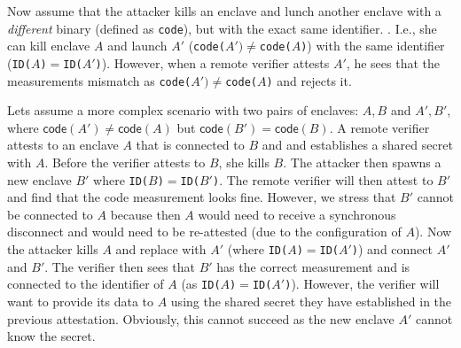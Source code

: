 Now assume that the attacker kills an enclave and lunch another enclave with a \emph{different} binary (defined as \texttt{code}), but with the exact same identifier. . I.e., she can kill enclave $A$ and launch $A'$ (\texttt{code($A')\neq$code($A$)}) with the same identifier (\texttt{ID($A$)$=$ID($A'$)}). However, when a remote verifier attests $A'$, he sees that the measurements mismatch as \texttt{code($A')\neq$code($A$)} and rejects it.

Lets assume a more complex scenario with two pairs of enclaves: $A, B$ and $A', B'$, where $\textsf{code} (A')\neq \textsf{code} (A)$ but $\textsf{code} (B') = \textsf{code} (B)$. 
A remote verifier attests to an enclave $A$ that is connected to $B$ and and establishes a shared secret with $A$. Before the verifier attests to $B$, she kills $B$. The attacker then spawns a new enclave $B'$ where \texttt{ID($B$)$=$ID($B'$)}. The remote verifier will then attest to $B'$ and find that the code measurement looks fine. However, we stress that $B'$ cannot be connected to $A$ because then $A$ would need to receive a synchronous disconnect and would need to be re-attested (due to the configuration of $A$). Now the attacker kills $A$ and replace with $A'$ (where \texttt{ID($A$)$=$ID($A'$)}) and connect $A'$ and $B'$. The verifier then sees that $B'$ has the correct measurement and is connected to the identifier of $A$ (as \texttt{ID($A$)$=$ID($A'$)}). However, the verifier will want to provide its data to $A$ using the shared secret they have established in the previous attestation. Obviously, this cannot succeed as the new enclave $A'$ cannot know the secret.
 
